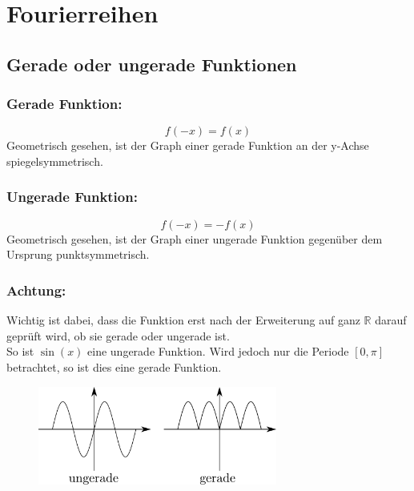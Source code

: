 



\section{Fourierreihen}

\subsection{Gerade oder ungerade Funktionen}

\subsubsection{Gerade Funktion: }
\[ \boxed{f(-x) = f(x)} \]
Geometrisch gesehen, ist der Graph einer gerade Funktion an der y-Achse 
spiegelsymmetrisch.
\subsubsection{Ungerade Funktion: }
\[ \boxed{f(-x) = -f(x)} \]
Geometrisch gesehen, ist der Graph einer ungerade Funktion gegenüber dem 
Ursprung punktsymmetrisch.
\subsubsection{Achtung: }
Wichtig ist dabei, dass die Funktion erst nach der Erweiterung auf ganz 
$\mathbb{R}$ darauf geprüft wird, ob sie gerade oder ungerade ist. \\
So ist $\sin(x)$ eine ungerade Funktion. Wird jedoch nur die Periode 
$[0, \pi]$ betrachtet, so ist dies eine gerade Funktion.

\begin{figure}[h!]
\centering
\includegraphics[width=0.7\textwidth]{geradeungerade.pdf}
\end{figure}

